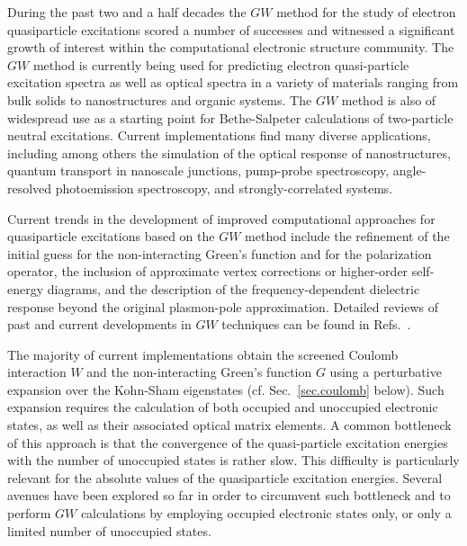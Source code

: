 \documentclass[twocolumn,prb,showpacs,superscriptaddress]{revtex4}
\begin{document}
During the past two and a half decades the $GW$ method\cite{hedin1,hl86}
for the study of electron quasiparticle excitations
scored a number of successes and witnessed a significant growth of interest
within the computational electronic structure community.
The $GW$ method is currently being used for predicting electron quasi-particle
excitation spectra as well as optical spectra in a variety of materials
ranging from bulk solids to nanostructures and organic systems. The
$GW$ method is also of widespread use as a starting point for Bethe-Salpeter calculations
of two-particle neutral excitations.\cite{onida,rolfing,reining-review}
Current implementations find many diverse applications,
including among others the simulation of the optical response of nanostructures,\cite{catalin} quantum transport in nanoscale
junctions,\cite{rubio} pump-probe spectroscopy,\cite{catalin-lw} angle-resolved photoemission
spectroscopy,\cite{cheolhwan} and strongly-correlated systems.\cite{bruneval-oxide}

Current trends in the development of improved computational approaches for
quasiparticle excitations based on the $GW$ method include the refinement
of the initial guess for the non-interacting Green's function and for the
polarization operator,\cite{rinke,schilfegarde}
the inclusion of approximate vertex corrections or higher-order self-energy
diagrams,\cite{york} and the description of the frequency-dependent
dielectric response beyond the original plasmon-pole approximation.\cite{spacetime,blochl}
Detailed reviews of past and current developments in $GW$ techniques can be
found in Refs.\ .

The majority of current implementations obtain the screened Coulomb interaction
$W$ and the non-interacting Green's function $G$ using a perturbative
expansion over the Kohn-Sham eigenstates (cf. Sec.\ \ref{sec.coulomb} below). 
Such expansion requires the calculation of both occupied and unoccupied electronic states,
as well as their associated optical matrix elements.\cite{hl86} A common bottleneck 
of this approach is that the convergence of the quasi-particle excitation energies
with the number 
of unoccupied states is rather slow.\cite{sohrab} This difficulty is particularly relevant
for the absolute values of the quasiparticle excitation energies.\cite{bruneval-gonze}
%
Several avenues have been explored so far in order to circumvent such bottleneck 
and to perform $GW$ calculations by employing occupied electronic states only,\cite{reining-sternheimer,umari1,umari2,gygi}
or only a limited number of unoccupied states.\cite{bruneval-gonze}
\end{document}
